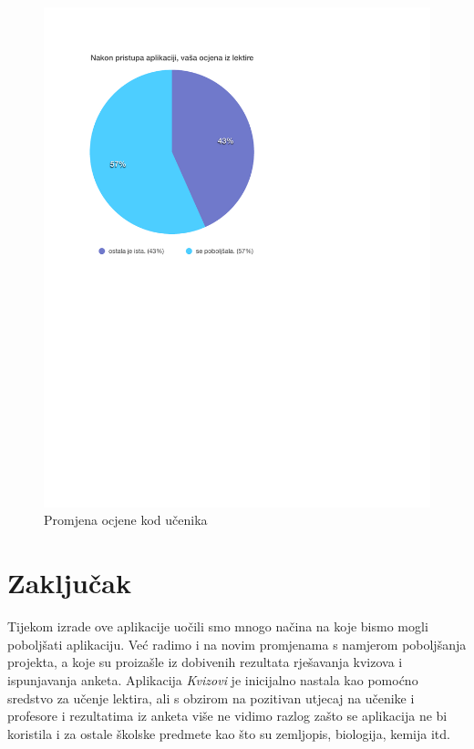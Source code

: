 \documentclass{scrreprt}
\begin{document}
\begin{figure}[H]
  \includegraphics[width=\textwidth, clip=true, trim=0 2.5cm 0 0]{student/grades}
  \caption{Promjena ocjene kod učenika}
  \label{fig:student/grades}
\end{figure}

\chapter{Zaključak}

Tijekom izrade ove aplikacije uočili smo mnogo načina na koje bismo mogli
poboljšati aplikaciju. Već radimo i na novim promjenama s namjerom poboljšanja
projekta, a koje su proizašle iz dobivenih rezultata rješavanja kvizova i
ispunjavanja anketa. Aplikacija \emph{Kvizovi} je inicijalno nastala kao pomoćno
sredstvo za učenje lektira, ali s obzirom na pozitivan utjecaj na učenike i
profesore i rezultatima iz anketa više ne vidimo razlog zašto se aplikacija ne
bi koristila i za ostale školske predmete kao što su zemljopis, biologija,
kemija itd.
\end{document}

